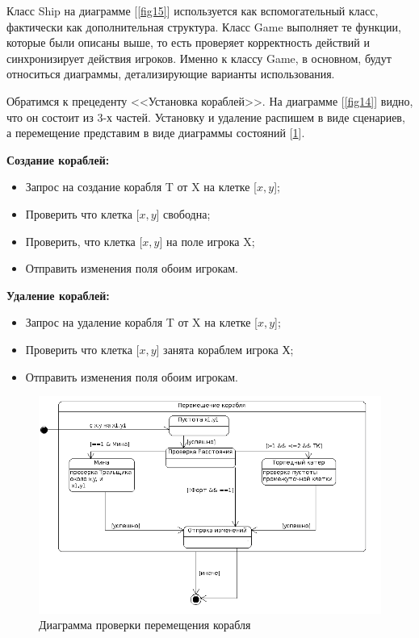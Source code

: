 Класс Ship на диаграмме [\ref{fig15}] используется как вспомогательный класс, фактически как дополнительная структура. Класс Game выполняет те функции, которые были описаны выше, то есть проверяет корректность действий и синхронизирует действия игроков. Именно к классу Game, в основном, будут относиться диаграммы, детализирующие варианты использования.

Обратимся к прецеденту <<Установка кораблей>>. На диаграмме [\ref{fig14}] видно, что он состоит из 3-х частей. Установку и удаление распишем в виде сценариев, а перемещение представим в виде диаграммы состояний [\ref{fig16}].  


\textbf{Создание кораблей:}
	
		\begin{itemize}		
			\item Запрос на создание корабля T от X на клетке [$x,y$];		
			\item Проверить что клетка [$x,y$] свободна;
			\item Проверить, что клетка [$x,y$] на поле игрока X;
			\item Отправить изменения поля обоим игрокам.		
		\end{itemize}


\textbf{Удаление кораблей:}

		\begin{itemize}		
			\item Запрос на удаление корабля T от X на клетке [$x,y$];		
			\item Проверить что клетка [$x,y$] занята кораблем игрока Х;
		\item Отправить изменения поля обоим игрокам.	
		\end{itemize}


\begin{figure}[htp]
\centering
\includegraphics[width=16cm]{images/statemove.png}
\caption{Диаграмма проверки перемещения корабля}
\label{fig16}
\end{figure}

